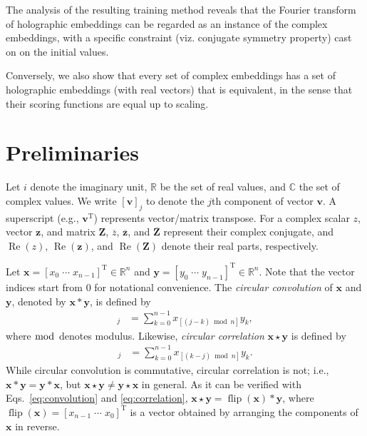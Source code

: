 \documentclass[11pt,a4paper]{article}
\def\mat#1{\boldsymbol{\mathbf{#1}}}
\def\transpose{^{\mathrm{T}}}
\def\Cset{\mathbb{C}}
\def\Rset{\mathbb{R}}
\let\cconv*
\let\ccorr\star
\def\RE{\mathop{\text{Re}}}
\def\flip{\mathop{\text{flip}}}
\begin{document}
The analysis of the resulting training method reveals that
the Fourier transform of holographic embeddings can be regarded as an instance of
the complex embeddings,
with a specific constraint (viz. conjugate symmetry property) cast on
on the initial values.

Conversely, we also show that every set of complex embeddings has
a set of holographic embeddings (with real vectors)
that is equivalent,
in the sense that their scoring functions are equal up to scaling.


\section{Preliminaries}
\label{sec:prelim}

Let $i$ denote the imaginary unit,
$\Rset$ be the set of real values,
and $\Cset$ the set of complex values.
We write $[\mat{v}]_j$ to denote the $j$th component of vector $\mat{v}$.
A superscript  (e.g., $\mat{v}\transpose$) represents vector/matrix transpose.
For a complex scalar $z$, vector $\mat{z}$, and matrix $\mat{Z}$,
$\overline{z}$, $\overline{\mat{z}}$, and $\overline{\mat{Z}}$ represent their complex conjugate,
and $\RE(z)$, $\RE(\mat{z})$, and $\RE(\mat{Z})$ denote their real parts, respectively.

Let
$ \mat{x} = [x_0 \; \cdots \; x_{n-1}]\transpose \in \Rset^n$ and
$ \mat{y} = [y_0 \; \cdots \; y_{n-1}]\transpose \in \Rset^n$.
Note that the vector indices start from $0$ for notational convenience.
The \emph{circular convolution} of $\mat{x}$ and $\mat{y}$,
denoted by $\mat{x} \cconv \mat{y}$,
is defined by
\begin{align}
  [\mat{x} \cconv \mat{y}]_j &= \sum_{k=0}^{n-1} x_{[(j-k)\bmod n]} y_k,
  \label{eq:convolution}
\end{align}
where $\bmod$ denotes modulus.
Likewise, \emph{circular correlation} $\mat{x} \ccorr \mat{y}$ is defined by
\begin{align}
  [\mat{x} \ccorr \mat{y}]_j &= \sum_{k=0}^{n-1} x_{[(k-j)\bmod n]} y_k.
  \label{eq:correlation}
\end{align}
While circular convolution is commutative, circular correlation is not;
i.e.,
$\mat{x} \cconv \mat{y} = \mat{y} \cconv \mat{x}$, but
$\mat{x} \ccorr \mat{y} \ne \mat{y} \ccorr \mat{x}$ in general.
As it can be verified with Eqs.~\eqref{eq:convolution} and \eqref{eq:correlation},
$\mat{x} \ccorr \mat{y} = \flip(\mat{x}) \cconv \mat{y}$,
where $\flip(\mat{x}) = [x_{n-1} \; \cdots \; x_0]\transpose$ is a vector
obtained by arranging the components of $\mat{x}$ in reverse.
\end{document}
